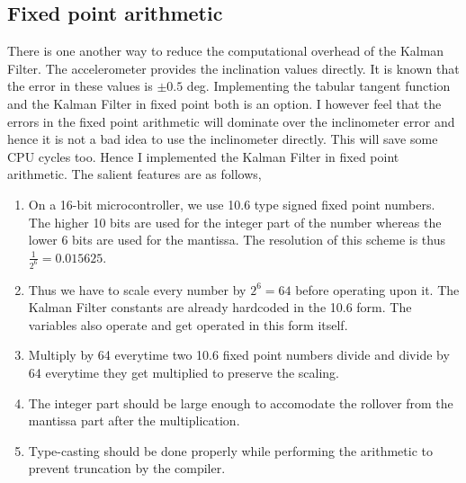 \subsection*{Fixed point arithmetic}
\label{subsec:fp}
There is one another way to reduce the computational overhead of the Kalman Filter. The accelerometer
provides the inclination values directly. It is known that the error in these values is $\pm0.5$ deg.
Implementing the tabular tangent function and the Kalman Filter in fixed point both is an option.
I however feel that the errors in the fixed point arithmetic will dominate over the inclinometer error
and hence it is not a bad idea to use the inclinometer directly. This will save some CPU cycles too.
Hence I implemented the Kalman Filter in fixed point arithmetic. The salient features are as follows,
\begin{enumerate}
\item
On a 16-bit microcontroller, we use 10.6 type signed fixed point numbers. The higher 10 bits are used
for the integer part of the number whereas the lower 6 bits are used for the mantissa. The
resolution of this scheme is thus $\frac{1}{2^{6}} = 0.015625$.
\item
Thus we have to scale every number by $2^{6} = 64$ before operating upon it. The Kalman
Filter constants are already hardcoded in the 10.6 form. The variables also operate and
get operated in this form itself.
\item
Multiply by 64 everytime two 10.6 fixed point numbers divide and divide by 64 everytime they get
multiplied to preserve the scaling.
\item
The integer part should be large enough to accomodate the rollover from the mantissa part after the
multiplication.
\item
Type-casting should be done properly while performing the arithmetic to prevent truncation by the
compiler.
\end{enumerate}

